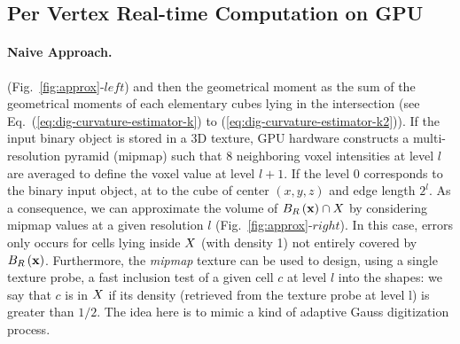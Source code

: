 \documentclass{llncs}
\begin{document}

\subsection{Per Vertex Real-time Computation on GPU}
\label{sec:hierarchical}

\paragraph{Naive Approach.}
(Fig.~\ref{fig:approx}-$left$) and then  the
geometrical moment as the sum of the geometrical moments of each elementary
cubes lying in the intersection (see
Eq.~(\ref{eq:dig-curvature-estimator-k}) to (\ref{eq:dig-curvature-estimator-k2})).
If the input binary object is stored in a
3D texture, GPU hardware constructs a multi-resolution pyramid (mipmap) such that 8
neighboring voxel intensities at level $l$ are averaged to define the voxel
value at level $l+1$. If the level 0 corresponds to the binary input object, at
to the cube of center $(x,y,z)$ and edge length $2^l$. As a consequence, we can
approximate the volume of $B_{R}\left(\mathbf{x}\right)\cap X$ by considering mipmap values
at a given resolution $l$ (Fig.~\ref{fig:approx}-$right$). In this case, errors only
occurs for cells lying inside $X$ (with density 1) not entirely covered by
$B_{R}\left(\mathbf{x}\right)$. Furthermore, the \emph{mipmap} texture can be used to design,
using a single texture probe, a fast inclusion test of a given cell $c$ at level
$l$ into the shapes: we say that $c$ is in $X$ if its density (retrieved
from the texture probe at level l) is greater than $1/2$. The idea here is to
mimic a kind of adaptive Gauss digitization process.
\end{document}
